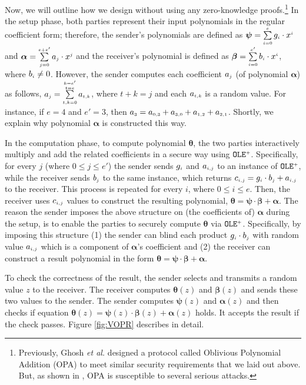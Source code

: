 Now, we will outline how we design \vopr without using any zero-knowledge proofs.\footnote{Previously, Ghosh \textit{et al.}  \cite{GhoshN19} designed a protocol called Oblivious Polynomial Addition (OPA) to meet similar security requirements that we laid out above. But, as shown in \cite{AbadiMZ21}, OPA  is susceptible to several serious attacks. } In the setup phase, both parties represent their input polynomials in the regular coefficient form; therefore, the sender's polynomials are defined as $\bm\psi=\sum\limits^{\scriptscriptstyle e}_{\scriptscriptstyle i=0}g_{\scriptscriptstyle i}\cdot x^{\scriptscriptstyle i}$ and  $\bm\alpha=\sum\limits^{\scriptscriptstyle e+e'}_{\scriptscriptstyle j=0}a_{\scriptscriptstyle j}\cdot x^{\scriptscriptstyle j}$ and the receiver's polynomial is defined as $\bm\beta=\sum\limits^{\scriptscriptstyle e'}_{\scriptscriptstyle i=0}b_{\scriptscriptstyle i}\cdot x^{\scriptscriptstyle i}$, where $b_{\scriptscriptstyle i}\neq 0$. However, the sender computes each coefficient $a_{\scriptscriptstyle j}$ (of polynomial $\bm \alpha$) as follows,  $a_{\scriptscriptstyle j}=\sum\limits^{\substack{\scriptscriptstyle k=e'\\ \scriptscriptstyle t=e}}_{\scriptscriptstyle t,k=0} a_{\scriptscriptstyle t,k}$,  where  $t+k=j$ and each $a_{\scriptscriptstyle t,k}$ is a random value. For instance, if $e=4$ and $e'=3$, then $a_{\scriptscriptstyle 3}=a_{\scriptscriptstyle \scriptscriptstyle 0,3}+a_{\scriptscriptstyle 3,0}+a_{\scriptscriptstyle 1,2}+a_{\scriptscriptstyle 2,1}$. Shortly, we explain why polynomial $\bm\alpha$ is constructed this way. 



In the computation phase,  to compute polynomial $\bm\theta$, the two parties interactively multiply and add the related coefficients in a secure way using $\mathtt{OLE}^{\scriptscriptstyle +}$. Specifically,
%
%
for every $j$  (where $0\leq j\leq e'$) the sender sends $g_{\scriptscriptstyle i}$ and $a_{\scriptscriptstyle i,j}$ to an instance of  $\mathtt{OLE}^{\scriptscriptstyle +}$, while the receiver sends $b_{\scriptscriptstyle j}$ to the same instance,  which returns $c_{\scriptscriptstyle i,j}=g_{\scriptscriptstyle i}\cdot b_{\scriptscriptstyle j}+ a_{\scriptscriptstyle i,j}$ to the receiver. This process is repeated for every $i$, where $0 \leq i \leq e$. Then, the receiver uses $c_{\scriptscriptstyle i,j}$ values to construct the resulting polynomial, $\bm\theta=\bm\psi\cdot \bm\beta+\bm\alpha$.  
%
The reason the sender imposes the above structure on (the coefficients of)  $\bm\alpha$ during the setup, is to enable the parties to securely compute $\bm\theta$ via  $\mathtt{OLE}^{\scriptscriptstyle +}$. Specifically, by imposing this structure (1) the sender  can blind each product $g_{\scriptscriptstyle i}\cdot b_{\scriptscriptstyle j}$  with  random value $a_{\scriptscriptstyle i,j}$ which is a component of $\bm\alpha$'s coefficient and (2) the receiver can construct a result polynomial in the form $\bm\theta=\bm\psi\cdot \bm\beta+\bm\alpha$. 


To check the correctness of the result, the sender selects and transmits a random value $z$ to the receiver.  The receiver computes  $\bm\theta(z)$ and $\bm\beta(z)$ and sends these two values  to the sender. The sender computes  $\bm\psi(z)$ and $\bm\alpha(z)$ and then checks if equation  $\bm\theta({ z})=\bm\psi({ z})\cdot \bm\beta({ z})+\bm\alpha({ z})$ holds. It accepts the result if the check passes.   Figure \ref{fig:VOPR} describes \vopr in detail. 


